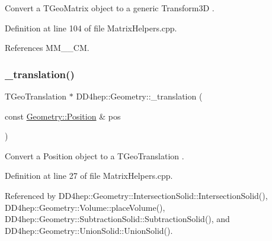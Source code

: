 Convert a T\+Geo\+Matrix object to a generic Transform3D . 



Definition at line 104 of file Matrix\+Helpers.\+cpp.



References M\+M\+\_\+\_\+\+CM.

\hypertarget{group___d_d4_h_e_p___g_e_o_m_e_t_r_y_ga2a9c214ef0a2444cccf194669fe81771}{}\label{group___d_d4_h_e_p___g_e_o_m_e_t_r_y_ga2a9c214ef0a2444cccf194669fe81771} 
\subsubsection{\texorpdfstring{\+\_\+translation()}{\_translation()}}
{\footnotesize\ttfamily T\+Geo\+Translation $\ast$ D\+D4hep\+::\+Geometry\+::\+\_\+translation (\begin{DoxyParamCaption}\item[{const \hyperlink{namespace_d_d4hep_1_1_geometry_a55083902099d03506c6db01b80404900}{Geometry\+::\+Position} \&}]{pos }\end{DoxyParamCaption})}



Convert a Position object to a T\+Geo\+Translation . 



Definition at line 27 of file Matrix\+Helpers.\+cpp.



Referenced by D\+D4hep\+::\+Geometry\+::\+Intersection\+Solid\+::\+Intersection\+Solid(), D\+D4hep\+::\+Geometry\+::\+Volume\+::place\+Volume(), D\+D4hep\+::\+Geometry\+::\+Subtraction\+Solid\+::\+Subtraction\+Solid(), and D\+D4hep\+::\+Geometry\+::\+Union\+Solid\+::\+Union\+Solid().

\hypertarget{group___d_d4_h_e_p___g_e_o_m_e_t_r_y_ga446608ca1668ae2b3ad24c3ea5b2bc1e}{}\label{group___d_d4_h_e_p___g_e_o_m_e_t_r_y_ga446608ca1668ae2b3ad24c3ea5b2bc1e} 
